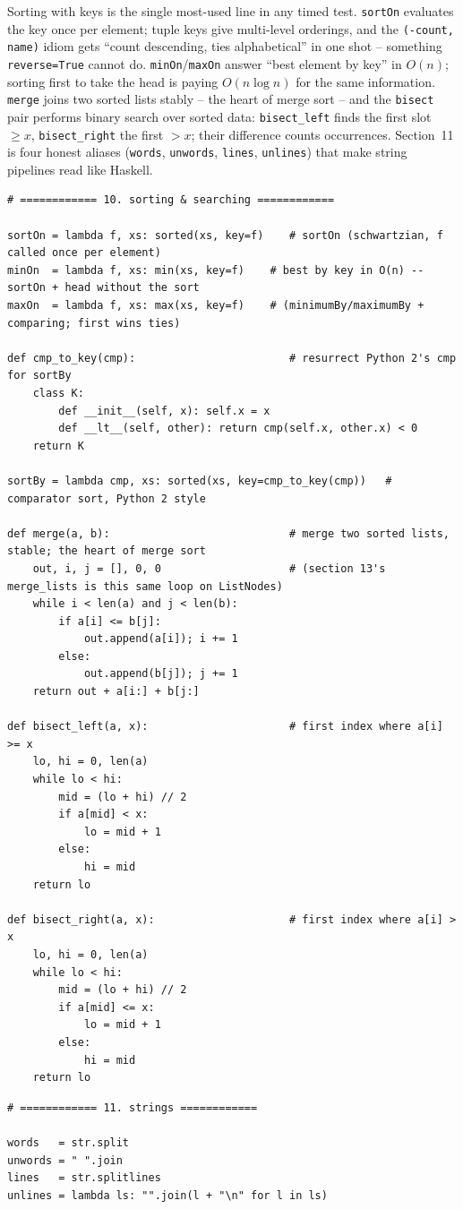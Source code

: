 \documentclass[11pt,letterpaper]{book}
\begin{document}
Sorting with keys is the single most-used line in any timed test.
\texttt{sortOn} evaluates the key once per element; tuple keys give multi-level
orderings, and the \texttt{(-count, name)} idiom gets ``count descending, ties
alphabetical'' in one shot -- something \texttt{reverse=True} cannot do.
\texttt{minOn}/\texttt{maxOn} answer ``best element by key'' in $O(n)$;
sorting first to take the head is paying $O(n \log n)$ for the same
information. \texttt{merge} joins two sorted lists stably -- the heart of merge
sort -- and the \texttt{bisect} pair performs binary search over sorted data:
\texttt{bisect\_left} finds the first slot $\ge x$, \texttt{bisect\_right} the
first $> x$; their difference counts occurrences. Section~11 is four honest
aliases (\texttt{words}, \texttt{unwords}, \texttt{lines}, \texttt{unlines})
that make string pipelines read like Haskell.
\begin{lstlisting}[style=code]
# ============ 10. sorting & searching ============

sortOn = lambda f, xs: sorted(xs, key=f)    # sortOn (schwartzian, f called once per element)
minOn  = lambda f, xs: min(xs, key=f)    # best by key in O(n) -- sortOn + head without the sort
maxOn  = lambda f, xs: max(xs, key=f)    # (minimumBy/maximumBy + comparing; first wins ties)

def cmp_to_key(cmp):                        # resurrect Python 2's cmp for sortBy
    class K:
        def __init__(self, x): self.x = x
        def __lt__(self, other): return cmp(self.x, other.x) < 0
    return K

sortBy = lambda cmp, xs: sorted(xs, key=cmp_to_key(cmp))   # comparator sort, Python 2 style

def merge(a, b):                            # merge two sorted lists, stable; the heart of merge sort
    out, i, j = [], 0, 0                    # (section 13's merge_lists is this same loop on ListNodes)
    while i < len(a) and j < len(b):
        if a[i] <= b[j]:
            out.append(a[i]); i += 1
        else:
            out.append(b[j]); j += 1
    return out + a[i:] + b[j:]

def bisect_left(a, x):                      # first index where a[i] >= x
    lo, hi = 0, len(a)
    while lo < hi:
        mid = (lo + hi) // 2
        if a[mid] < x:
            lo = mid + 1
        else:
            hi = mid
    return lo

def bisect_right(a, x):                     # first index where a[i] > x
    lo, hi = 0, len(a)
    while lo < hi:
        mid = (lo + hi) // 2
        if a[mid] <= x:
            lo = mid + 1
        else:
            hi = mid
    return lo
\end{lstlisting}
\begin{lstlisting}[style=code]
# ============ 11. strings ============

words   = str.split
unwords = " ".join
lines   = str.splitlines
unlines = lambda ls: "".join(l + "\n" for l in ls)
\end{lstlisting}
\end{document}
